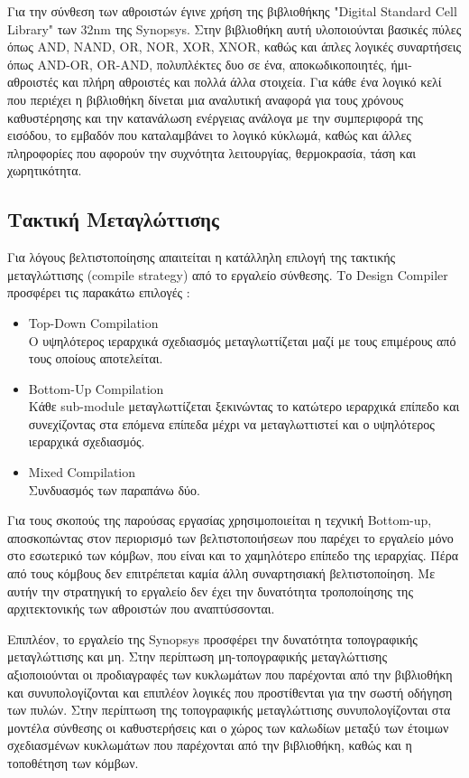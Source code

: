 Για την σύνθεση των αθροιστών έγινε χρήση της βιβλιοθήκης "Digital Standard Cell Library" 
των 32nm της Synopsys. Στην βιβλιοθήκη αυτή υλοποιούνται βασικές πύλες όπως AND, NAND, 
OR, NOR, XOR, XNOR, καθώς και άπλες λογικές συναρτήσεις όπως AND-OR, OR-AND, πολυπλέκτες 
δυο σε ένα, αποκωδικοποιητές, ήμι-αθροιστές και πλήρη αθροιστές και πολλά άλλα στοιχεία.
Για κάθε ένα λογικό κελί που περιέχει η βιβλιοθήκη δίνεται μια αναλυτική αναφορά
για τους χρόνους καθυστέρησης και την κατανάλωση ενέργειας ανάλογα με την συμπεριφορά της εισόδου,
το εμβαδόν που καταλαμβάνει το λογικό κύκλωμά, καθώς και άλλες πληροφορίες που αφορούν την 
συχνότητα λειτουργίας, θερμοκρασία, τάση και χωρητικότητα.









\subsection{Τακτική Μεταγλώττισης}

Για λόγους βελτιστοποίησης απαιτείται η κατάλληλη επιλογή της τακτικής μεταγλώττισης (compile strategy) από το εργαλείο σύνθεσης. Το Design Compiler προσφέρει τις παρακάτω επιλογές :
\begin{itemize}
  \item Top-Down Compilation\\
  Ο υψηλότερος ιεραρχικά σχεδιασμός μεταγλωττίζεται μαζί με τους επιμέρους από τους οποίους αποτελείται.
  \item Bottom-Up Compilation\\
  Κάθε sub-module μεταγλωττίζεται ξεκινώντας το κατώτερο ιεραρχικά επίπεδο και συνεχίζοντας στα επόμενα επίπεδα μέχρι να μεταγλωττιστεί και ο υψηλότερος ιεραρχικά σχεδιασμός.
  \item Mixed Compilation\\
  Συνδυασμός των παραπάνω δύο.
\end{itemize}
Για τους σκοπούς της παρούσας εργασίας χρησιμοποιείται η τεχνική Bottom-up, αποσκοπώντας στον περιορισμό των βελτιστοποιήσεων που παρέχει το εργαλείο μόνο στο εσωτερικό των κόμβων, που είναι και το χαμηλότερο επίπεδο της ιεραρχίας. Πέρα από τους κόμβους δεν επιτρέπεται καμία άλλη συναρτησιακή βελτιστοποίηση. Με αυτήν την στρατηγική το εργαλείο δεν έχει την δυνατότητα τροποποίησης της αρχιτεκτονικής των αθροιστών που αναπτύσσονται.

Επιπλέον, το εργαλείο της Synopsys προσφέρει την δυνατότητα τοπογραφικής μεταγλώττισης και μη. Στην περίπτωση μη-τοπογραφικής μεταγλώττισης αξιοποιούνται οι προδιαγραφές των κυκλωμάτων που παρέχονται από την βιβλιοθήκη και συνυπολογίζονται και επιπλέον λογικές που προστίθενται για την σωστή οδήγηση των πυλών. Στην περίπτωση της τοπογραφικής μεταγλώττισης συνυπολογίζονται στα μοντέλα σύνθεσης οι καθυστερήσεις και ο χώρος των καλωδίων μεταξύ των έτοιμων σχεδιασμένων κυκλωμάτων που παρέχονται από την βιβλιοθήκη, καθώς και η τοποθέτηση των κόμβων.











